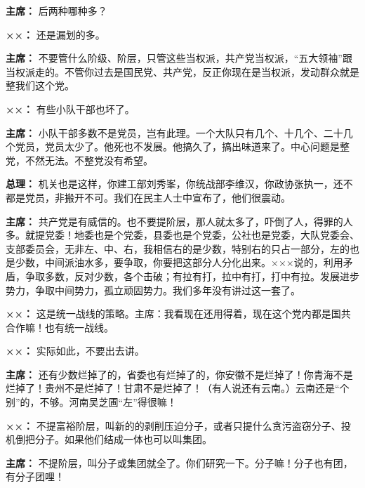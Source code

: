 \begin{list}{}
\item[\textbf{主席：}] 后两种哪种多？

\item[\textbf{××：}] 还是漏划的多。

\item[\textbf{主席：}] 不要管什么阶级、阶层，只管这些当权派，共产党当权派，“五大领袖”跟当权派走的。不管你过去是国民党、共产党，反正你现在是当权派，发动群众就是整我们这个党。

\item[\textbf{××：}] 有些小队干部也坏了。

\item[\textbf{主席：}] 小队干部多数不是党员，岂有此理。一个大队只有几个、十几个、二十几个党员，党员太少了。他死也不发展。他搞久了，搞出味道来了。中心问题是整党，不然无法。不整党没有希望。

\item[\textbf{总理：}] 机关也是这样，你建工部刘秀峯，你统战部李维汉，你政协张执一，还不都是党员，非搬开不可。我们在民主人士中宣布了，他们很震动。

\item[\textbf{主席：}] 共产党是有威信的。也不要提阶层，那人就太多了，吓倒了人，得罪的人多。就提党委！地委也是个党委，县委也是个党委，公社也是党委，大队党委会、支部委员会，无非左、中、右，我相信右的是少数，特别右的只占一部分，左的也是少数，中间派油水多，要争取，你要把这部分人分化出来。×××说的，利用矛盾，争取多数，反对少数，各个击破；有拉有打，拉中有打，打中有拉。发展进步势力，争取中间势力，孤立顽固势力。我们多年没有讲过这一套了。

\item[\textbf{××：}] 这是统一战线的策略。主席：我看现在还用得着，现在这个党内都是国共合作嘛！也有统一战线。

\item[\textbf{××：}] 实际如此，不要出去讲。

\item[\textbf{主席：}] 还有少数烂掉了的，省委也有烂掉了的，你安徽不是烂掉了！你青海不是烂掉了！贵州不是烂掉了！甘肃不是烂掉了！（有人说还有云南。）云南还是“个别”的，不够。河南吴芝圃“左”得很嘛！

\item[\textbf{××：}] 不提富裕阶层，叫新的的剥削压迫分子，或者只提什么贪污盗窃分子、投机倒把分子。如果他们结成一体也可以叫集团。

\item[\textbf{主席：}] 不提阶层，叫分子或集团就全了。你们研究一下。分子嘛！分子也有团，有分子团哩！


\end{list}
